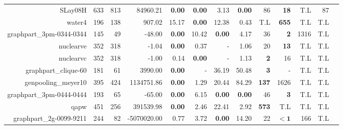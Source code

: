 \begin{landscape}
\begin{table*}[t]
\begin{tabular}{|r|r|r||r||r|r|r|r||r|r|r|r|r|}
                          SLay08H &          633 &          813 &            84960.21 &  \textbf{0.00} &  \textbf{0.00} &           3.13 &  \textbf{0.00} &                 86 &        \textbf{18} &          T.L &           87 \\ 
                           water4 &          196 &          138 &              907.02 &          15.17 &  \textbf{0.00} &          12.38 &           0.43 &                T.L &       \textbf{655} &          T.L &          T.L \\ 
         graphpart\_3pm-0344-0344 &          145 &           49 &              -48.00 &  \textbf{0.00} &          10.42 &  \textbf{0.00} &           4.17 &                 36 &         \textbf{2} &         1316 &          T.L \\ 
                        nuclearve &          352 &          318 &               -1.04 &  \textbf{0.00} &           0.37 &              - &           1.06 &                 20 &        \textbf{13} &          T.L &          T.L \\ 
                        nuclearvc &          352 &          318 &               -1.00 &           0.14 &  \textbf{0.00} &              - &           1.13 &         \textbf{2} &                 16 &          T.L &          T.L \\ 
             graphpart\_clique-60 &          181 &           61 &             3990.00 &  \textbf{0.00} &              - &          36.19 &          50.48 &         \textbf{3} &                  - &          T.L &          T.L \\ 
              genpooling\_meyer10 &          395 &          424 &          1134751.86 &  \textbf{0.00} &           1.29 &          20.44 &          84.29 &       \textbf{137} &               1626 &          T.L &          T.L \\ 
         graphpart\_3pm-0444-0444 &          193 &           65 &              -65.00 &  \textbf{0.00} &           6.15 &  \textbf{0.00} &  \textbf{0.00} &                 46 &         \textbf{3} &          T.L &          T.L \\ 
                             qapw &          451 &          256 &           391539.98 &  \textbf{0.00} &           2.46 &          22.41 &           2.92 &       \textbf{573} &                T.L &          T.L &          T.L \\ 
          graphpart\_2g-0099-9211 &          244 &           82 &         -5070020.00 &           0.77 &           3.72 &  \textbf{0.00} &          14.20 &                 22 &         $\bm{< 1}$ &          166 &          T.L \\ 

\end{tabular}
\end{table*}
\end{landscape}
